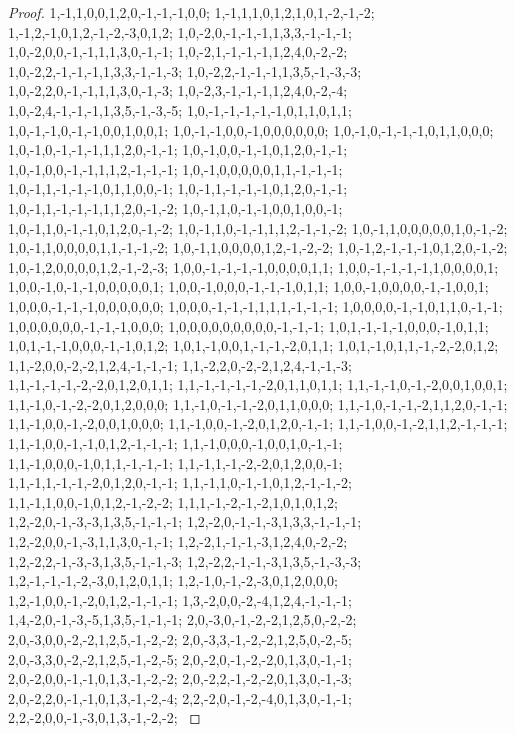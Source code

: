 \documentclass{article}
\begin{document}
\begin{proof}
{{1,-1,1,0,0,1,2,0,-1,-1,-1,0,0; 1,-1,1,1,0,1,2,1,0,1,-2,-1,-2; 1,-1,2,-1,0,1,2,-1,-2,-3,0,1,2; 1,0,-2,0,-1,-1,-1,1,3,3,-1,-1,-1; 1,0,-2,0,0,-1,-1,1,1,3,0,-1,-1; 1,0,-2,1,-1,-1,-1,1,2,4,0,-2,-2; 1,0,-2,2,-1,-1,-1,1,3,3,-1,-1,-3; 1,0,-2,2,-1,-1,-1,1,3,5,-1,-3,-3; 1,0,-2,2,0,-1,-1,1,1,3,0,-1,-3; 1,0,-2,3,-1,-1,-1,1,2,4,0,-2,-4; 1,0,-2,4,-1,-1,-1,1,3,5,-1,-3,-5; 1,0,-1,-1,-1,-1,-1,0,1,1,0,1,1;
1,0,-1,-1,0,-1,-1,0,0,1,0,0,1; 1,0,-1,-1,0,0,-1,0,0,0,0,0,0; 1,0,-1,0,-1,-1,-1,0,1,1,0,0,0; 1,0,-1,0,-1,-1,-1,1,1,2,0,-1,-1; 1,0,-1,0,0,-1,-1,0,1,2,0,-1,-1; 1,0,-1,0,0,-1,-1,1,1,2,-1,-1,-1; 1,0,-1,0,0,0,0,0,1,1,-1,-1,-1; 1,0,-1,1,-1,-1,-1,0,1,1,0,0,-1; 1,0,-1,1,-1,-1,-1,0,1,2,0,-1,-1; 1,0,-1,1,-1,-1,-1,1,1,2,0,-1,-2; 1,0,-1,1,0,-1,-1,0,0,1,0,0,-1; 1,0,-1,1,0,-1,-1,0,1,2,0,-1,-2;
1,0,-1,1,0,-1,-1,1,1,2,-1,-1,-2; 1,0,-1,1,0,0,0,0,0,1,0,-1,-2; 1,0,-1,1,0,0,0,0,1,1,-1,-1,-2; 1,0,-1,1,0,0,0,0,1,2,-1,-2,-2; 1,0,-1,2,-1,-1,-1,0,1,2,0,-1,-2; 1,0,-1,2,0,0,0,0,1,2,-1,-2,-3; 1,0,0,-1,-1,-1,-1,0,0,0,0,1,1; 1,0,0,-1,-1,-1,-1,1,0,0,0,0,1; 1,0,0,-1,0,-1,-1,0,0,0,0,0,1; 1,0,0,-1,0,0,0,-1,-1,-1,0,1,1; 1,0,0,-1,0,0,0,0,-1,-1,0,0,1; 1,0,0,0,-1,-1,-1,0,0,0,0,0,0;
1,0,0,0,-1,-1,-1,1,1,1,-1,-1,-1; 1,0,0,0,0,-1,-1,0,1,1,0,-1,-1; 1,0,0,0,0,0,0,-1,-1,-1,0,0,0; 1,0,0,0,0,0,0,0,0,0,-1,-1,-1; 1,0,1,-1,-1,-1,0,0,0,-1,0,1,1; 1,0,1,-1,-1,0,0,0,-1,-1,0,1,2; 1,0,1,-1,0,0,1,-1,-1,-2,0,1,1; 1,0,1,-1,0,1,1,-1,-2,-2,0,1,2; 1,1,-2,0,0,-2,-2,1,2,4,-1,-1,-1; 1,1,-2,2,0,-2,-2,1,2,4,-1,-1,-3; 1,1,-1,-1,-1,-2,-2,0,1,2,0,1,1; 1,1,-1,-1,-1,-1,-2,0,1,1,0,1,1;
1,1,-1,-1,0,-1,-2,0,0,1,0,0,1; 1,1,-1,0,-1,-2,-2,0,1,2,0,0,0; 1,1,-1,0,-1,-1,-2,0,1,1,0,0,0; 1,1,-1,0,-1,-1,-2,1,1,2,0,-1,-1; 1,1,-1,0,0,-1,-2,0,0,1,0,0,0; 1,1,-1,0,0,-1,-2,0,1,2,0,-1,-1; 1,1,-1,0,0,-1,-2,1,1,2,-1,-1,-1; 1,1,-1,0,0,-1,-1,0,1,2,-1,-1,-1; 1,1,-1,0,0,0,-1,0,0,1,0,-1,-1; 1,1,-1,0,0,0,-1,0,1,1,-1,-1,-1; 1,1,-1,1,-1,-2,-2,0,1,2,0,0,-1; 1,1,-1,1,-1,-1,-2,0,1,2,0,-1,-1;
1,1,-1,1,0,-1,-1,0,1,2,-1,-1,-2; 1,1,-1,1,0,0,-1,0,1,2,-1,-2,-2; 1,1,1,-1,-2,-1,-2,1,0,1,0,1,2; 1,2,-2,0,-1,-3,-3,1,3,5,-1,-1,-1; 1,2,-2,0,-1,-1,-3,1,3,3,-1,-1,-1; 1,2,-2,0,0,-1,-3,1,1,3,0,-1,-1; 1,2,-2,1,-1,-1,-3,1,2,4,0,-2,-2; 1,2,-2,2,-1,-3,-3,1,3,5,-1,-1,-3; 1,2,-2,2,-1,-1,-3,1,3,5,-1,-3,-3; 1,2,-1,-1,-1,-2,-3,0,1,2,0,1,1; 1,2,-1,0,-1,-2,-3,0,1,2,0,0,0; 1,2,-1,0,0,-1,-2,0,1,2,-1,-1,-1;
1,3,-2,0,0,-2,-4,1,2,4,-1,-1,-1; 1,4,-2,0,-1,-3,-5,1,3,5,-1,-1,-1; 2,0,-3,0,-1,-2,-2,1,2,5,0,-2,-2; 2,0,-3,0,0,-2,-2,1,2,5,-1,-2,-2; 2,0,-3,3,-1,-2,-2,1,2,5,0,-2,-5; 2,0,-3,3,0,-2,-2,1,2,5,-1,-2,-5; 2,0,-2,0,-1,-2,-2,0,1,3,0,-1,-1; 2,0,-2,0,0,-1,-1,0,1,3,-1,-2,-2; 2,0,-2,2,-1,-2,-2,0,1,3,0,-1,-3; 2,0,-2,2,0,-1,-1,0,1,3,-1,-2,-4; 2,2,-2,0,-1,-2,-4,0,1,3,0,-1,-1; 2,2,-2,0,0,-1,-3,0,1,3,-1,-2,-2;
}}
\end{proof}
\end{document}
